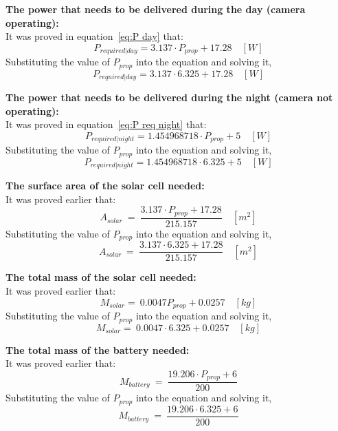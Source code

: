 \vspace{1cm}

\p \textbf{The power that needs to be delivered during the day (camera operating):} \vspace{0.1cm}\\
It was proved in equation~\ref{eq:P day} that:
\[ P_{required|day} = 3.137 \cdot P_{prop} + 17.28 \quad [W] \]
Substituting the value of $ P_{prop} $ into the equation and solving it,
\[ P_{required|day} = 3.137 \cdot 6.325 + 17.28 \quad [W] \]
\boxtwo

\vspace{1cm}

\p \textbf{The power that needs to be delivered during the night (camera not operating):} \vspace{0.1cm}\\
It was proved in equation~\ref{eq:P req night} that:
\[ P_{required | night} = 1.454968718 \cdot P_{prop} + 5 \quad [W] \]
Substituting the value of $ P_{prop} $ into the equation and solving it,
\[ P_{required | night} = 1.454968718 \cdot 6.325 + 5 \quad [W] \]
\boxthree

\vspace{1cm}

\p \textbf{The surface area of the solar cell needed:} \vspace{0.1cm}\\
It was proved earlier that:
\[ A_{solar} \ = \ \frac{ 3.137 \cdot P_{prop} + 17.28 }{ 215.157 } \quad [m^2] \]
Substituting the value of $ P_{prop} $ into the equation and solving it,
\[ A_{solar} \ = \ \frac{ 3.137 \cdot 6.325 + 17.28 }{ 215.157 } \quad [m^2] \]

\boxfour

\vspace{1cm}

\p \textbf{The total mass of the solar cell needed:} \vspace{0.1cm}\\
It was proved earlier that:
\[ M_{solar} = \ 0.0047 P_{prop} + 0.0257  \quad [kg] \]
Substituting the value of $ P_{prop} $ into the equation and solving it,
\[ M_{solar} = \ 0.0047 \cdot 6.325 + 0.0257  \quad [kg] \]
\boxfive

\vspace{1cm}
\p \textbf{The total mass of the battery needed:} \vspace{0.1cm}\\
It was proved earlier that:
\[ M_{battery} \ = \ \frac{ 19.206 \cdot P_{prop} + 6 }{ 200 } \]
Substituting the value of $ P_{prop} $ into the equation and solving it,
\[ M_{battery} \ = \ \frac{ 19.206 \cdot 6.325 + 6 }{ 200 } \]
\boxsix
